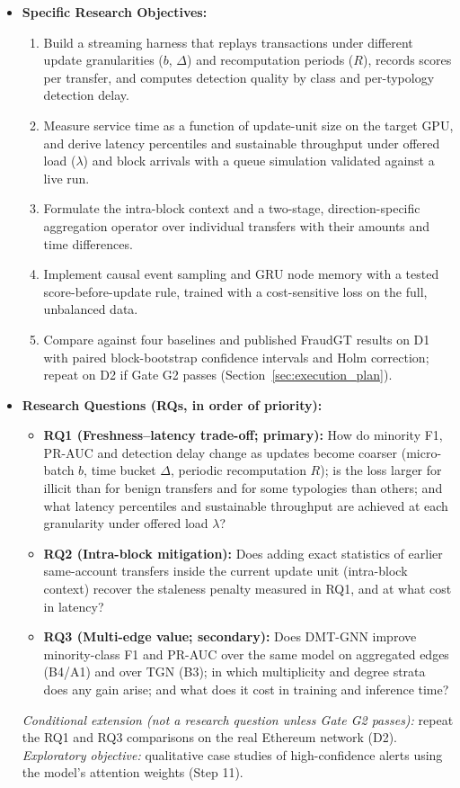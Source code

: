 \documentclass[11pt,a4paper]{article}
\begin{document}
\begin{itemize}[leftmargin=*]
    \item \textbf{Specific Research Objectives:}
    \begin{enumerate}[leftmargin=*]
        \item Build a streaming harness that replays transactions under different update granularities ($b$, $\Delta$) and recomputation periods ($R$), records scores per transfer, and computes detection quality by class and per-typology detection delay.
        \item Measure service time as a function of update-unit size on the target GPU, and derive latency percentiles and sustainable throughput under offered load ($\lambda$) and block arrivals with a queue simulation validated against a live run.
        \item Formulate the intra-block context and a two-stage, direction-specific aggregation operator over individual transfers with their amounts and time differences.
        \item Implement causal event sampling and GRU node memory with a tested score-before-update rule, trained with a cost-sensitive loss on the full, unbalanced data.
        \item Compare against four baselines and published FraudGT results on D1 with paired block-bootstrap confidence intervals and Holm correction; repeat on D2 if Gate G2 passes (Section~\ref{sec:execution_plan}).
    \end{enumerate}

    \item \textbf{Research Questions (RQs, in order of priority):}
    \begin{itemize}[leftmargin=*]
        \item \textbf{RQ1 (Freshness--latency trade-off; primary):} How do minority F1, PR-AUC and detection delay change as updates become coarser (micro-batch $b$, time bucket $\Delta$, periodic recomputation $R$); is the loss larger for illicit than for benign transfers and for some typologies than others; and what latency percentiles and sustainable throughput are achieved at each granularity under offered load $\lambda$?
        \item \textbf{RQ2 (Intra-block mitigation):} Does adding exact statistics of earlier same-account transfers inside the current update unit (intra-block context) recover the staleness penalty measured in RQ1, and at what cost in latency?
        \item \textbf{RQ3 (Multi-edge value; secondary):} Does DMT-GNN improve minority-class F1 and PR-AUC over the same model on aggregated edges (B4/A1) and over TGN (B3); in which multiplicity and degree strata does any gain arise; and what does it cost in training and inference time?
    \end{itemize}
    \textit{Conditional extension (not a research question unless Gate G2 passes):} repeat the RQ1 and RQ3 comparisons on the real Ethereum network (D2). \textit{Exploratory objective:} qualitative case studies of high-confidence alerts using the model's attention weights (Step 11).


\end{itemize}
\end{document}
